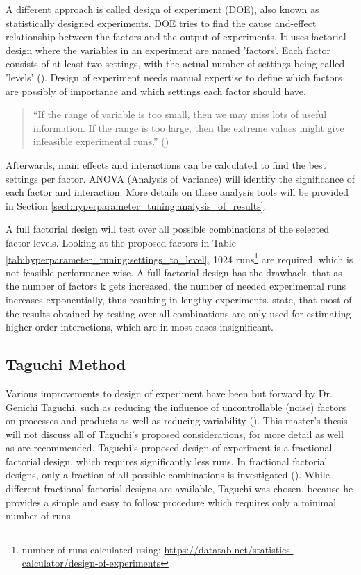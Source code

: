 A different approach is called design of experiment (DOE), also known as statistically designed experiments. DOE tries to find the cause and-effect relationship between the factors and the output of experiments.
It uses factorial design where the variables in an experiment are named 'factors'. Each factor consists of at least two settings, with the actual number of settings being called 'levels' (\cite{yang_design_2009}). Design of experiment needs manual expertise to define which factors are possibly of importance and which settings each factor should have.

\begin{quote}
	\begin{em}
		\enquote{If the range of variable is too small, then we may miss lots of useful information. If the range is too large, then the extreme values might give infeasible experimental runs.} (\cite{yang_design_2009})
	\end{em}
\end{quote}

Afterwards, main effects and interactions can be calculated to find the best settings per factor. ANOVA (Analysis of Variance) will identify the significance of each factor and interaction. More details on these analysis tools will be provided in Section \ref{sect:hyperparameter_tuning:analysis_of_results}.

A full factorial design will test over all possible combinations of the selected factor levels. Looking at the proposed factors in Table \ref{tab:hyperparameter_tuning:settings_to_level}, 1024 runs\footnote{number of runs calculated using: \url{https://datatab.net/statistics-calculator/design-of-experiments}} are required, which is not feasible performance wise. A full factorial design has the drawback, that as the number of factors k gets increased, the number of needed experimental runs increases exponentially, thus resulting in lengthy experiments. \cite{yang_design_2009} state, that most of the results obtained by testing over all combinations are only used for estimating higher-order interactions, which are in most cases insignificant.

\subsection{Taguchi Method}
Various improvements to design of experiment have been but forward by Dr. Genichi Taguchi, such as reducing the influence of uncontrollable (noise) factors on processes and products as well as reducing variability (\cite{roy_primer_1990}). This master's thesis will not discuss all of Taguchi's proposed considerations, for more detail \cite{roy_primer_1990} as well as \cite{yang_design_2009} are recommended. Taguchi's proposed design of experiment is a fractional factorial design, which requires significantly less runs. In fractional factorial designs, only a fraction of all possible combinations is investigated (\cite{roy_primer_1990}). While different fractional factorial designs are available, Taguchi was chosen, because he provides a simple and easy to follow procedure which requires only a minimal number of runs. 

